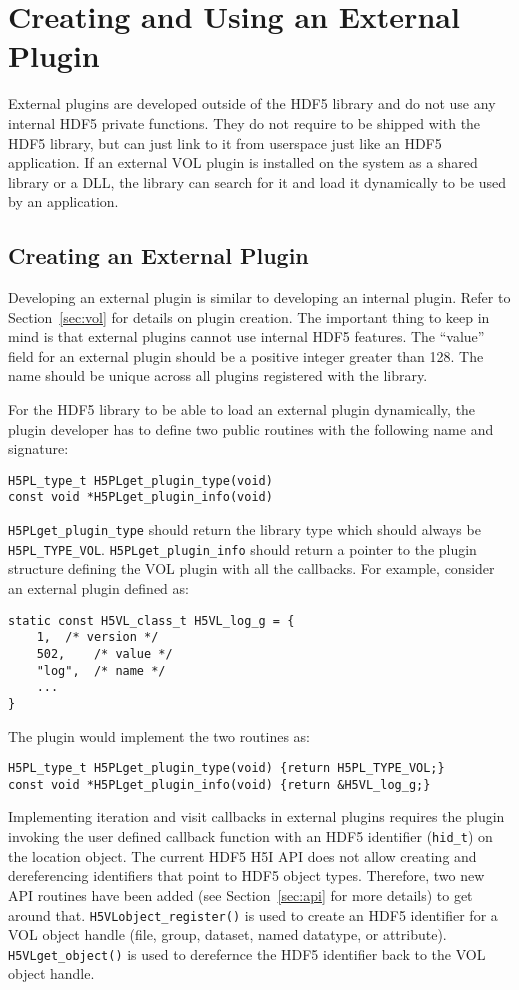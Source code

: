 \section{Creating and Using an External Plugin}
External plugins are developed outside of the HDF5 library and do not
use any internal HDF5 private functions. They do not require to be
shipped with the HDF5 library, but can just link to it from userspace
just like an HDF5 application. If an external VOL plugin is installed on the system as a shared library or a DLL, the library can search for it and load it dynamically to be used by an application.

\subsection{Creating an External Plugin}
Developing an external plugin is similar to developing an internal plugin. Refer to Section~\ref{sec:vol} for details on plugin creation. The important thing to keep in mind is that external plugins cannot use internal HDF5 features. The ``value'' field for an external plugin should be a positive integer greater than 128. The name should be unique across all plugins registered with the library.

For the HDF5 library to be able to load an external plugin dynamically, the plugin developer has to define two public routines with the following name and signature:
\begin{lstlisting}
H5PL_type_t H5PLget_plugin_type(void)
const void *H5PLget_plugin_info(void)
\end{lstlisting}
{\tt H5PLget\_plugin\_type} should return the library type which should always be {\tt H5PL\_TYPE\_VOL}. {\tt H5PLget\_plugin\_info} should return a pointer to the plugin structure defining the VOL plugin with all the callbacks. For example, consider an external plugin defined as:
\begin{lstlisting}
static const H5VL_class_t H5VL_log_g = {
    1,	/* version */
    502,	/* value */
    "log",	/* name */
    ...
}
\end{lstlisting}
The plugin would implement the two routines as:
\begin{lstlisting}
H5PL_type_t H5PLget_plugin_type(void) {return H5PL_TYPE_VOL;}
const void *H5PLget_plugin_info(void) {return &H5VL_log_g;}
\end{lstlisting}

Implementing iteration and visit callbacks in external plugins requires the plugin invoking the user defined callback function with an HDF5 identifier ({\tt hid\_t}) on the location object. The current HDF5 H5I API does not allow creating and dereferencing identifiers that point to HDF5 object types. Therefore, two new API routines have been added (see Section~\ref{sec:api} for more details) to get around that. {\tt H5VLobject\_register()} is used to create an HDF5 identifier for a VOL object handle (file, group, dataset, named datatype, or attribute). {\tt H5VLget\_object()} is used to derefernce the HDF5 identifier back to the VOL object handle.

